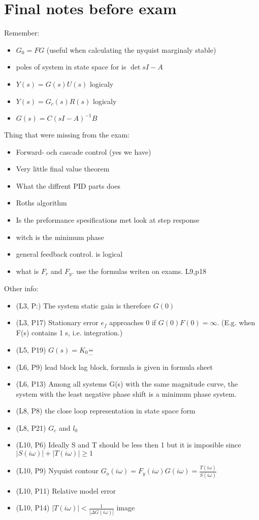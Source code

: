 \documentclass{article}
\begin{document}
\section{Final notes before exam}

Remember:
\begin{itemize}
    \item $G_0 = FG$ (useful when calculating the nyquist marginaly stable)
    \item poles of system in state space for is $\det{sI-A}$ 
    \item $Y(s) = G(s)U(s)$ logicaly
    \item $Y(s) = G_c(s)R(s)$ logicaly
    \item $G(s) = C(sI-A)^{-1}B$ 
\end{itemize}

Thing that were missing from the exam:
\begin{itemize}
    \item Forward- och cascade control (yes we have)
    \item Very little final value theorem
    \item What the diffrent PID parts does
    \item Roths algorithm
    \item Is the preformance spesifications met look at step response
    \item witch is the minimum phase
    \item general feedback control. is logical
    \item what is $F_r$ and $F_y$. use the formulas writen on exams. L9,p18
\end{itemize}

Other info:
\begin{itemize}
    \item (L3, P:) The system static gain is therefore $G(0)$ 
    \item (L3, P17) Stationary error $e_f$ approaches $0$ if $G(0)F(0) = \infty$. (E.g. when F(s) contains 1 s, i.e. integration.)
    \item (L5, P19) $G(s)=K_0\frac{\ldots}{\ldots}$
    \item (L6, P9) lead block lag block, formula is given in formula sheet
    \item (L6, P13) Among all systems G(s) with the same magnitude curve, the system with the least negative phase shift is a minimum phase system.
    \item (L8, P8) the close loop representation in state space form 
    \item (L8, P21) $G_c$ and $l_0$
    \item (L10, P6) Ideally S and T should be less then 1 but it is imposible since $|S(i\omega)|+|T(i\omega)|\geq 1$
    \item (L10, P9) Nyquist contour $G_o(i\omega) = F_y(i\omega)G(i\omega) = \frac{T(i\omega)}{S(i\omega)}$
    \item (L10, P11) Relative model error 
    \item (L10, P14) $|T(i\omega)| < \frac{1}{|\Delta G(i\omega)|}$ image
\end{itemize}
\end{document}
